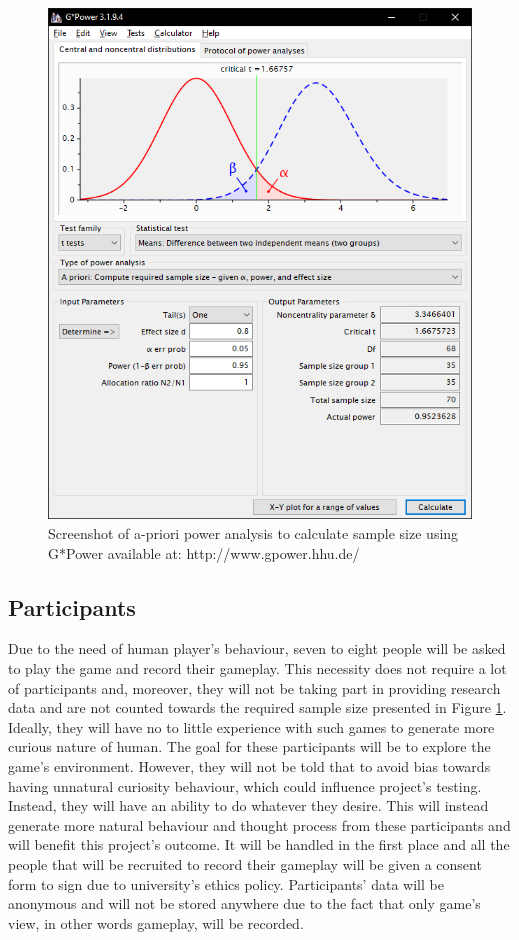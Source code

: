 \documentclass[journal]{IEEEtran}
\begin{document}
\begin{figure}
	\includegraphics[width=\linewidth]{GPower.PNG}
	\caption{Screenshot of a-priori power analysis to calculate sample size using G*Power available at: http://www.gpower.hhu.de/}
	\label{fig:gpower}
\end{figure}

\subsection{Participants}
Due to the need of human player's behaviour, seven to eight people will be asked to play the game and record their gameplay. This necessity does not require a lot of participants and, moreover, they will not be taking part in providing research data and are not counted towards the required sample size presented in Figure \ref{fig:gpower}. Ideally, they will have no to little experience with such games to generate more curious nature of human. The goal for these participants will be to explore the game's environment. However, they will not be told that to avoid bias towards having unnatural curiosity behaviour, which could influence project's testing. Instead, they will have an ability to do whatever they desire. This will instead generate more natural behaviour and thought process from these participants and will benefit this project's outcome. It will be handled in the first place and all the people that will be recruited to record their gameplay will be given a consent form to sign due to university's ethics policy. Participants' data will be anonymous and will not be stored anywhere due to the fact that only game's view, in other words gameplay, will be recorded.
\end{document}
